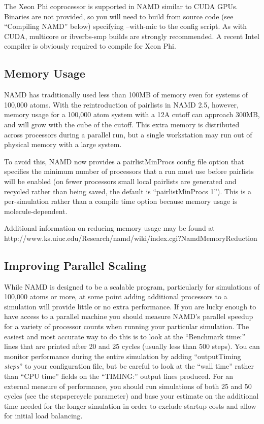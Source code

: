 The Xeon Phi coprocessor is supported in NAMD similar to CUDA GPUs.
Binaries are not provided, so you will need to build from source code
(see ``Compiling NAMD'' below) specifying --with-mic to the config script.
As with CUDA, multicore or ibverbs-smp builds are strongly recommended.
A recent Intel compiler is obviously required to compile for Xeon Phi.

\subsection{Memory Usage}

NAMD has traditionally used less than 100MB of memory even for systems
of 100,000 atoms.  With the reintroduction of pairlists in NAMD 2.5,
however, memory usage for a 100,000 atom system with a 12A cutoff can
approach 300MB, and will grow with the cube of the cutoff.  This extra
memory is distributed across processors during a parallel run, but a
single workstation may run out of physical memory with a large system.

To avoid this, NAMD now provides a pairlistMinProcs config file option
that specifies the minimum number of processors that a run must use
before pairlists will be enabled (on fewer processors small local
pairlists are generated and recycled rather than being saved, the
default is ``pairlistMinProcs 1'').  This is a per-simulation rather than
a compile time option because memory usage is molecule-dependent.

Additional information on reducing memory usage may be found at
http://www.ks.uiuc.edu/Research/namd/wiki/index.cgi?NamdMemoryReduction

\subsection{Improving Parallel Scaling}

While NAMD is designed to be a scalable program, particularly for
simulations of 100,000 atoms or more, at some point adding additional
processors to a simulation will provide little or no extra performance.
If you are lucky enough to have access to a parallel machine you should
measure NAMD's parallel speedup for a variety of processor counts when
running your particular simulation.  The easiest and most accurate way
to do this is to look at the ``Benchmark time:'' lines that are printed
after 20 and 25 cycles (usually less than 500 steps).  You can monitor
performance during the entire simulation by adding ``outputTiming {\em steps}''
to your configuration file, but be careful to look at the ``wall time''
rather than ``CPU time'' fields on the ``TIMING:'' output lines produced.
For an external measure of performance, you should run simulations of
both 25 and 50 cycles (see the stepspercycle parameter) and base your
estimate on the additional time needed for the longer simulation in
order to exclude startup costs and allow for initial load balancing.

